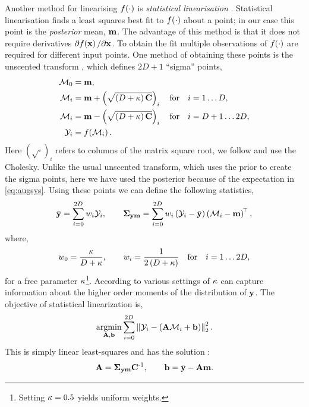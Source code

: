 \documentclass{article} %
\begin{document}
Another method for linearising $\nonlin{\cdot}$ is \emph{statistical
    linearisation} \cite{Geist2010}. Statistical linearisation finds a least
squares best fit to $\nonlin{\cdot}$ about a point; in our case this point is
the \emph{posterior} mean, $\pomean$. The advantage of this method is that it
does not require derivatives $\partial\nonlin{\lstate}/\partial\lstate$. To
obtain the fit multiple observations of $\nonlin{\cdot}$ are required for
different input points. One method of obtaining these points is the unscented
transform \cite{Julier2004}, which defines $2D+1$ ``sigma'' points,
\begin{align}
    \Sfunc_0 &= \pomean, \\
    \Sfunc_i &= \pomean + \brac{\sqrt{\brac{D + \scoef} \pocov}}_i \quad
        \text{for} \quad i = 1 \ldots D, \\
    \Sfunc_i &= \pomean - \brac{\sqrt{\brac{D + \scoef} \pocov}}_i \quad
        \text{for} \quad i = D+1 \ldots 2D, \\
    \Sobs_i &= \nonlin{\Sfunc_i}.
\end{align}
Here $(\sqrt{\cdot})_i$ refers to columns of the matrix square root, we follow
\cite{Julier2004} and use the Cholesky. Unlike the usual unscented transform,
which uses the prior to create the sigma points, here we have used the
posterior because of the expectation in \eqref{eq:augsys}. Using these points
we can define the following statistics,
\begin{equation}
    \bar\obs = \sum^{2D}_{i=0} \Sw_i \Sobs_i,
    \qquad
    \xcov = \sum^{2D}_{i=0} \Sw_i \brac{\Sobs_i - \bar\obs}
        \brac{\Sfunc_i - \pomean}\transpose,
\end{equation}
where,
\begin{equation}
    \Sw_0 = \frac{\scoef}{D + \scoef},
        \qquad \Sw_i = \frac{1}{2\brac{D + \scoef}}
        \quad \text{for} \quad i = 1 \ldots 2D,
\end{equation}
for a free parameter $\scoef$\footnote{Setting $\scoef = 0.5$ yields
    uniform weights.}. According to \cite{Julier2004} various settings of
$\scoef$ can capture information about the higher order moments of the
distribution of $\obs$. The objective of statistical linearization is,
\begin{equation}
    \argmin_{\Linmat, \intcpt} \sum^{2D}_{i=0} 
        \lnorm{2}{\Sobs_i - \brac{\Linmat\Sfunc_i + \intcpt}}^2.
\end{equation}
This is simply linear least-squares and has the solution \cite{Geist2010}:
\begin{equation}
    \Linmat = \xcov \pocov\inv, \qquad
    \intcpt = \bar\obs - \Linmat\pomean.
\end{equation}
\end{document}
